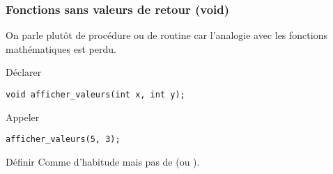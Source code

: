 \documentclass[xcolor=pdftex,svgnames,table]{beamer}
\begin{document}



\begin{frame}[fragile]
  \frametitle{Fonctions sans valeurs de retour (void)}

On parle plutôt de procédure ou de routine car l'analogie avec les
fonctions mathématiques est perdu.

 \begin{block}{Déclarer}
    \begin{lstlisting}[basicstyle=\ttfamily\small] 
void afficher_valeurs(int x, int y);
     \end{lstlisting}
  \end{block}

  \begin{block}{Appeler}
  \begin{lstlisting}[basicstyle=\ttfamily\small] 
afficher_valeurs(5, 3);
   \end{lstlisting}  
  \end{block}

  \begin{block}{Définir}
Comme d'habitude mais pas de  (ou ).
\end{block}
\end{frame}
\end{document}
